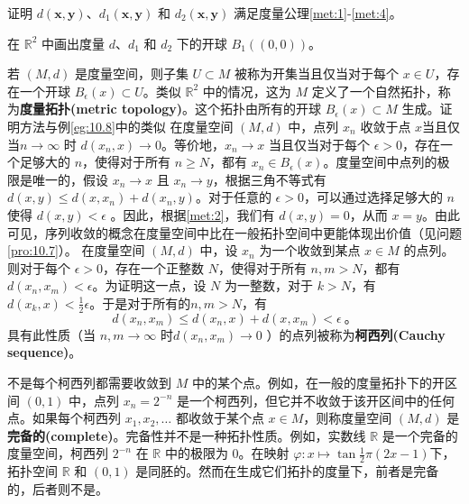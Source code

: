 \begin{exercise}
	证明 $d(\mathbf{x} ,\mathbf{y} )$、$d_{1} (\mathbf{x} ,\mathbf{y} )$ 和 $d_{2} (\mathbf{x} ,\mathbf{y} )$ 满足度量公理\ref{met:1}-\ref{met:4}。
\end{exercise}

\begin{exercise}
	在 $\mathbb{R}^{2}$ 中画出度量 $d$、$d_{1}$ 和 $d_{2}$ 下的开球 $B_{1} ((0,0))$。
\end{exercise}

	若 $(M,d)$ 是度量空间，则子集 $U\subset M$ 被称为开集当且仅当对于每个 $x\in U$，存在一个开球 $B_{\epsilon } (x)\subset U$。类似 $\mathbb{R}^{2}$ 中的情况，这为 $M$ 定义了一个自然拓扑，称为\textbf{度量拓扑(metric topology)}。这个拓扑由所有的开球 $B_{\epsilon } (x)\subset M$ 生成。证明方法与例\ref{eg:10.8}中的类似
	在度量空间 $(M,d)$ 中，点列 $x_{n}$ 收敛于点 $x$当且仅当$n\rightarrow \infty $ 时 $d(x_{n} ,x)\rightarrow 0$。等价地，$x_{n}\rightarrow x$ 当且仅当对于每个 $\epsilon  >0$，存在一个足够大的 $n$，使得对于所有 $n\geq N$，都有 $x_{n} \in B_{\epsilon } (x)$。度量空间中点列的极限是唯一的，假设 $x_{n}\rightarrow x$ 且 $x_{n}\rightarrow y$，根据三角不等式有 $d(x,y)\leq d(x,x_{n} )+d(x_{n} ,y)$。对于任意的 $\epsilon  >0$，可以通过选择足够大的 $n$ 使得 $d(x,y)< \epsilon $ 。因此，根据\ref{met:2}，我们有 $d(x,y)=0$，从而 $x=y$。由此可见，序列收敛的概念在度量空间中比在一般拓扑空间中更能体现出价值（见问题\ref{pro:10.7}）。
	在度量空间 $(M,d)$ 中，设 $x_{n}$ 为一个收敛到某点 $x\in M$ 的点列。则对于每个 $\epsilon  >0$，存在一个正整数 $N$，使得对于所有 $n,m >N$，都有 $d(x_{n} ,x_{m} )< \epsilon $。为证明这一点，设 $N$ 为一整数，对于 $k >N$，有 $d(x_{k} ,x)< \frac{1}{2} \epsilon $。于是对于所有的$n,m >N$，有
\begin{equation*}
    d(x_{n} ,x_{m} )\leq d(x_{n} ,x)+d(x,x_{m} )< \epsilon \ 。
\end{equation*}
具有此性质（当 $n,m\rightarrow \infty $ 时$d(x_{n} ,x_{m} )\rightarrow 0$ ）的点列被称为\textbf{柯西列(Cauchy sequence)}。

\begin{eg}\label{eg:10.11}
	不是每个柯西列都需要收敛到 $M$ 中的某个点。例如，在一般的度量拓扑下的开区间 $(0,1)$ 中，点列 $x_{n} =2^{-n}$ 是一个柯西列，但它并不收敛于该开区间中的任何点。如果每个柯西列 $x_{1} ,x_{2} ,\dotsc $ 都收敛于某个点 $x\in M$，则称度量空间 $(M,d)$ 是\textbf{完备的(complete)}。完备性并不是一种拓扑性质。例如，实数线 $\mathbb{R}$ 是一个完备的度量空间，柯西列 $2^{-n}$ 在 $\mathbb{R}$ 中的极限为 0。在映射 $\varphi :x\mapsto \tan\frac{1}{2} \pi (2x-1)$下，拓扑空间 $\mathbb{R}$ 和 $(0,1)$ 是同胚的。然而在生成它们拓扑的度量下，前者是完备的，后者则不是。
\end{eg}

